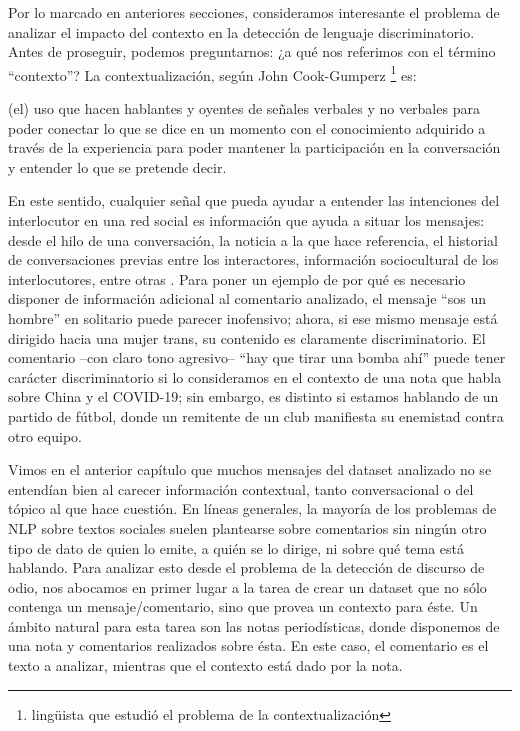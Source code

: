 \label{chap:05_dataset_creation}

Por lo marcado en anteriores secciones, consideramos interesante el problema de analizar el impacto del contexto en la detección de lenguaje discriminatorio. Antes de proseguir, podemos preguntarnos: ¿a qué nos referimos con el término ``contexto''? La contextualización, según John Cook-Gumperz \footnote{lingüista que estudió el problema de la contextualización} es:

\begin{displayquote}
    (el) uso que hacen hablantes y oyentes de señales verbales y no verbales para poder conectar lo que se dice en un momento con el conocimiento adquirido a través de la experiencia para poder mantener la participación en la conversación y entender lo que se pretende decir.
\end{displayquote}

En este sentido, cualquier señal que pueda ayudar a entender las intenciones del interlocutor en una red social es información que ayuda a situar los mensajes: desde el hilo de una conversación, la noticia a la que hace referencia, el historial de conversaciones previas entre los interactores, información sociocultural de los interlocutores, entre otras \cite{sheth2021defining}. Para poner un ejemplo de por qué es necesario disponer de información adicional al comentario analizado, el mensaje ``sos un hombre'' en solitario puede parecer inofensivo; ahora, si ese mismo mensaje está dirigido hacia una mujer trans, su contenido es claramente discriminatorio. El comentario --con claro tono agresivo-- ``hay que tirar una bomba ahí'' puede tener carácter discriminatorio si lo consideramos en el contexto de una nota que habla sobre China y el COVID-19; sin embargo, es distinto si estamos hablando de un partido de fútbol, donde un remitente de un club manifiesta su enemistad contra otro equipo.


Vimos en el anterior capítulo que muchos mensajes del dataset analizado no se entendían bien al carecer información contextual, tanto conversacional o del tópico al que hace cuestión. En líneas generales, la mayoría de los problemas de NLP sobre textos sociales suelen plantearse sobre comentarios sin ningún otro tipo de dato de quien lo emite, a quién se lo dirige, ni sobre qué tema está hablando. Para analizar esto desde el problema de la detección de discurso de odio, nos abocamos en primer lugar a la tarea de crear un dataset que no sólo contenga un mensaje/comentario, sino que provea un contexto para éste. Un ámbito natural para esta tarea son las notas periodísticas, donde disponemos de una nota y comentarios realizados sobre ésta. En este caso, el comentario es el texto a analizar, mientras que el contexto está dado por la nota.

